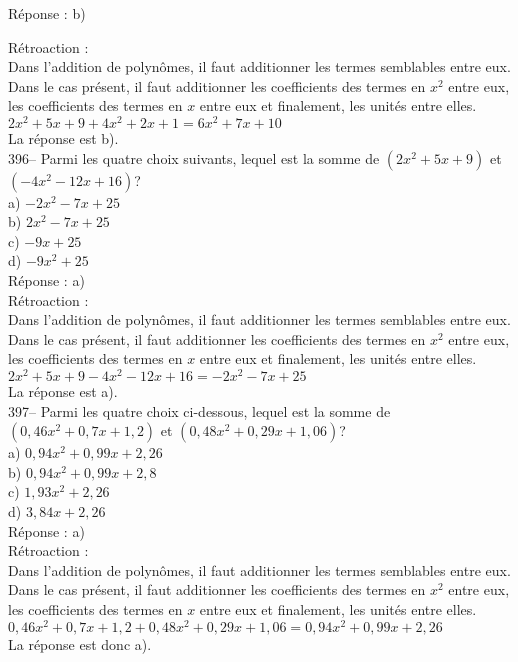 ﻿\documentclass[letterpaper, 12pt]{article}
\begin{document}
R\'eponse : b)

R\'etroaction : \\
Dans l'addition de polyn\^omes, il faut additionner les termes semblables
entre eux.  Dans le cas pr\'esent, il faut additionner les coefficients des
termes en $x^{2}$ entre eux, les coefficients des termes en $x$ entre eux et
finalement, les unit\'es entre elles.\\
$2x^{2}+5x+9 + 4x^{2}+2x+1 = 6x^{2}+7x+10$\\
La r\'eponse est b).\\

396-- Parmi les quatre choix suivants, lequel est la somme de
$(2x^{2}+5x+9)$ et $(-4x^{2}-12x+16)$?\\
a) $-2x^{2}-7x+25$\\
b) $2x^{2}-7x+25$\\
c) $-9x+25$\\
d) $-9x^{2}+25$\\

R\'eponse : a)\\

R\'etroaction : \\
Dans l'addition de polyn\^omes, il faut additionner les termes semblables
entre eux.  Dans le cas pr\'esent, il faut additionner les coefficients des
termes en $x^{2}$ entre eux, les coefficients des termes en $x$ entre eux et
finalement, les unit\'es entre elles. \\
$2x^{2}+5x+9 -4x^{2}-12x+16 = -2x^{2}-7x+25$\\
La r\'eponse est a).\\

397-- Parmi les quatre choix ci-dessous, lequel est la somme de
$(0,46x^{2}+0,7x+1,2)$ et $(0,48x^{2}+0,29x+1,06)$?\\
a) $0,94x^{2}+0,99x+2,26$ \\
b) $0,94x^{2}+0,99x+2,8$ \\
c) $1,93x^{2}+2,26$\\
d) $3,84x+2,26$\\

R\'eponse : a) \\

R\'etroaction : \\
Dans l'addition de polyn\^omes, il faut additionner les termes semblables
entre eux.  Dans le cas pr\'esent, il faut additionner les coefficients des
termes en $x^{2}$ entre eux, les coefficients des termes en $x$ entre eux et
finalement, les unit\'es entre elles. \\
$0,46x^{2}+0,7x+1,2+0,48x^{2}+0,29x+1,06=0,94x^{2}+0,99x+2,26$\\
La r\'eponse est donc a).\\
\end{document}
